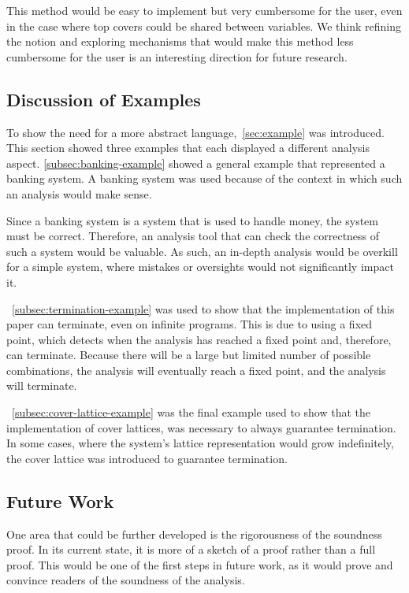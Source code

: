This method would be easy to implement but very cumbersome for the user, even in the case where top covers could be shared between variables.
We think refining the notion and exploring mechanisms that would make this method less cumbersome for the user is an interesting direction for future research.


\subsection{Discussion of Examples}\label{subsec:example-discussion}
To show the need for a more abstract language,~\autoref{sec:example} was introduced.
This section showed three examples that each displayed a different analysis aspect. \autoref{subsec:banking-example} showed a general example that represented a banking system.
A banking system was used because of the context in which such an analysis would make sense.

Since a banking system is a system that is used to handle money, the system must be correct.
Therefore, an analysis tool that can check the correctness of such a system would be valuable.
As such, an in-depth analysis would be overkill for a simple system, where mistakes or oversights would not significantly impact it.

~\autoref{subsec:termination-example} was used to show that the implementation of this paper can terminate, even on infinite programs.
This is due to using a fixed point, which detects when the analysis has reached a fixed point and, therefore, can terminate.
Because there will be a large but limited number of possible combinations, the analysis will eventually reach a fixed point, and the analysis will terminate.

~\autoref{subsec:cover-lattice-example} was the final example used to show that the implementation of cover lattices, was necessary to always guarantee termination.
In some cases, where the system's lattice representation would grow indefinitely, the cover lattice was introduced to guarantee termination.


\subsection{Future Work}\label{subsec:future-work}
One area that could be further developed is the rigorousness of the soundness proof.
In its current state, it is more of a sketch of a proof rather than a full proof.
This would be one of the first steps in future work, as it would prove and convince readers of the soundness of the analysis.

